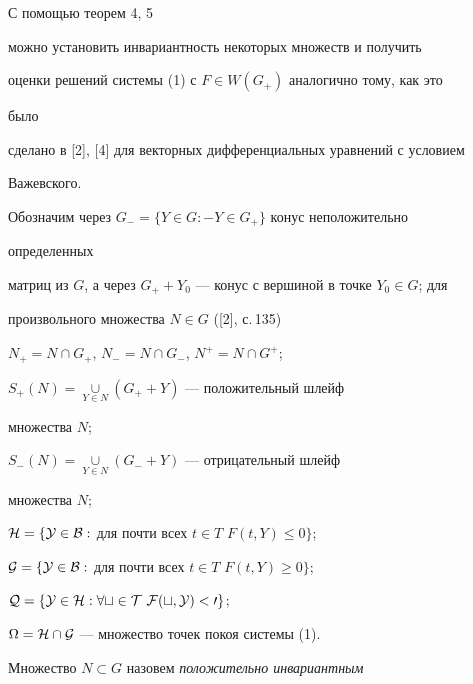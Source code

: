 {С помощью теорем 4, 5 


можно установить инвариантность некоторых множеств и получить 


оценки решений системы (1) с $F\in W(G_+)$ аналогично тому, как это 


было 


сделано в [2], [4] для векторных дифференциальных уравнений с условием 


Важевского. 


 


Обозначим через $G_-=\{Y\in G:-Y\in G_+\}$ конус неположительно 


определенных 


матриц из $G$, а через $G_++Y_0$ --- конус с вершиной в точке $Y_0\in 


G$; для 


произвольного множества $N\in G$ ([2], с.\,135) 


 


$N_+=N\cap G_+$, $N_-=N\cap G_-$, $N^+=N\cap G^+$; 


 


$S_+(N)=\mathop{\cup}\limits_{Y\in N}(G_++Y)$ --- положительный шлейф 


множества $N$; 


 


$S_-(N)=\mathop{\cup}\limits_{Y\in N}(G_-+Y)$ --- отрицательный шлейф 


множества $N$; 


 


$\cal H=\{Y\in \cal B:$ для почти всех $t\in T$\; $F(t,Y)\le0\}$; 


 


$\cal G=\{Y\in\cal B:$ для почти всех $t\in T$\; $F(t,Y)\ge0\}$; 


 


$\cal Q=\{Y\in\cal H:\forall t\in T\ F(t,Y)<0\}$; 


 


$\Omega=\cal H\cap \cal G$ --- множество точек покоя системы (1). 


 


Множество $N\subset G$ назовем {\it положительно инвариантным} 


}

